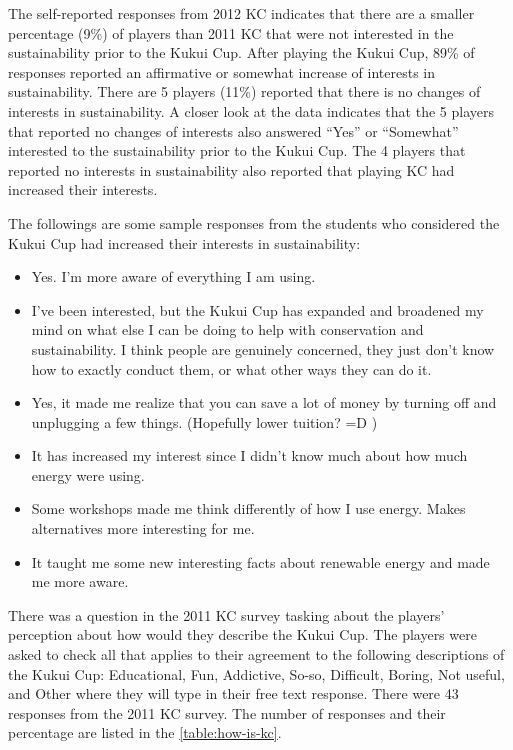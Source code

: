 The self-reported responses from 2012 KC indicates that there are a smaller percentage (9\%) of players than 2011 KC that were not interested in the sustainability prior to the Kukui Cup. After playing the Kukui Cup, 89\% of responses reported an affirmative or somewhat increase of interests in sustainability. There are 5 players (11\%)  reported that there is no changes of interests in sustainability. A closer look at the data indicates that the 5 players that reported no changes of interests also answered ``Yes'' or ``Somewhat'' interested to the sustainability prior to the Kukui Cup. The 4 players that reported no interests in sustainability also reported that playing KC had increased their interests.

The followings are some sample responses from the students who considered the Kukui Cup had increased their interests in sustainability:
 
 \begin{itemize}
 \item Yes. I'm more aware of everything I am using.
\item I've been interested, but the Kukui Cup has expanded and broadened my mind on what else I can be doing to help with conservation and sustainability. I think people are genuinely concerned, they just don't know how to exactly conduct them, or what other ways they can do it.
\item Yes, it made me realize that you can save a lot of money by turning off and unplugging a few things. (Hopefully lower tuition? =D )
\item It has increased my interest since I didn't know much about how much energy were using.
\item Some workshops made me think differently of how I use energy. Makes alternatives more interesting for me.
\item It taught me some new interesting facts about renewable energy and made me more aware.
\end{itemize}

There was a question in the 2011 KC survey tasking about the players' perception about how would they describe the Kukui Cup. The players were asked to check all that applies to their agreement to the following descriptions of the Kukui Cup: Educational, Fun, Addictive, So-so, Difficult, Boring, Not useful, and Other where they will type in their free text response. There were 43 responses from the 2011 KC survey. The number of responses and their percentage are listed in the \autoref{table:how-is-kc}.

